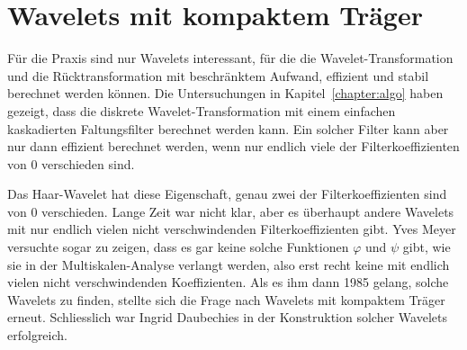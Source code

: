 %
%
%
\chapter{Wavelets mit kompaktem Träger
\label{chapter:kompakt}}
\rhead{}
Für die Praxis sind nur Wavelets interessant, für die die
Wavelet-Transformation und die Rücktransformation mit beschränktem Aufwand,
effizient und stabil berechnet werden können.
Die Untersuchungen in Kapitel~\ref{chapter:algo} haben gezeigt, dass 
die diskrete Wavelet-Transformation mit einem einfachen kaskadierten
Faltungsfilter berechnet werden kann.
Ein solcher Filter kann aber nur dann effizient berechnet werden,
wenn nur endlich viele der Filterkoeffizienten von 0 verschieden sind.

Das Haar-Wavelet hat diese Eigenschaft, genau zwei der Filterkoeffizienten
sind von 0 verschieden.
Lange Zeit war nicht klar, aber es überhaupt andere Wavelets mit
nur endlich vielen nicht verschwindenden Filterkoeffizienten gibt.
Yves Meyer versuchte sogar zu zeigen, dass es gar keine solche Funktionen
$\varphi$ und $\psi$ gibt, wie sie in der Multiskalen-Analyse verlangt
werden, also erst recht keine mit endlich vielen nicht verschwindenden
Koeffizienten.
Als es ihm dann 1985 gelang, solche Wavelets zu finden, stellte sich
die Frage nach Wavelets mit kompaktem Träger erneut.
Schliesslich war Ingrid Daubechies in der Konstruktion solcher Wavelets
erfolgreich.










